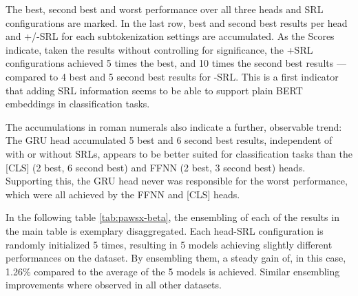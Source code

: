 The best, second best and worst performance over all three heads and SRL configurations
are marked. In the last row, best and second best results per head and +/-SRL for each
subtokenization settings are accumulated. As the Scores indicate, taken the results without
controlling for significance, the +SRL configurations
achieved 5 times the best, and 10 times the second best results --- compared to 4 best and
5 second best results for -SRL. This is a first indicator that adding SRL information seems
to be able to support plain BERT embeddings in classification tasks.

The accumulations in roman numerals also indicate a further, observable trend: The GRU head
accumulated 5 best and 6 second best results, independent of with or without SRLs, appears to be better
suited for classification tasks than the [CLS] (2 best, 6 second best) and FFNN (2 best, 3 second best) heads.
Supporting this, the GRU head never was responsible for the worst performance, which were all
achieved by the FFNN and [CLS] heads.

In the following table \ref{tab:pawsx-beta}, the ensembling of each of the results in the main table is
exemplary disaggregated. Each head-SRL configuration is randomly initialized 5 times, resulting in
5 models achieving slightly different performances on the dataset. By ensembling them, a steady gain of, in this case,
1.26\% compared to the average of the 5 models is achieved. Similar ensembling improvements where
observed in all other datasets.


